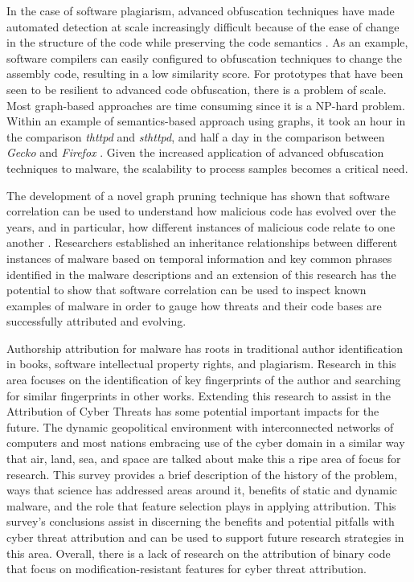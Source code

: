\documentclass[12pt]{report}
\begin{document}
In the case of software plagiarism, advanced obfuscation techniques have made automated detection at scale increasingly difficult because of the ease of change in the structure of the code while preserving the code semantics \cite{xu2020revisiting}.  As an example, software compilers can easily configured to obfuscation techniques to change the assembly code, resulting in a low similarity score.  For prototypes that have been seen to be resilient to advanced code obfuscation, there is a problem of scale.  Most graph-based approaches are time consuming since it is a NP-hard problem.  Within an example of semantics-based approach using graphs, it took an hour in  the  comparison \emph{thttpd} and \emph{sthttpd}, and half a day in the comparison between \emph{Gecko} and \emph{Firefox} \cite{luo2014semantics}.  Given the increased application of advanced obfuscation techniques to malware, the scalability to process samples becomes a critical need.

The development of a novel graph pruning technique has shown that software correlation can be used to understand how malicious code has evolved over the years, and in particular, how different instances of malicious code relate to one another \cite{gupta2009empirical}.  Researchers established an inheritance relationships between different instances of malware based on temporal information and key common phrases identified in the malware descriptions and an extension of this research has the potential to show that software correlation can be used to inspect known examples of malware in order to gauge how threats and their code bases are successfully attributed and evolving.

Authorship attribution for malware has roots in traditional author identification in books, software intellectual property rights, and plagiarism.  Research in this area focuses on the identification of key fingerprints of the author and searching for similar fingerprints in other works.  Extending this research to assist in the Attribution of Cyber Threats has some potential important impacts for the future.  The dynamic geopolitical environment with interconnected networks of computers and most nations embracing use of the cyber domain in a similar way that air, land, sea, and space are talked about make this a ripe area of focus for research.  This survey provides a brief description of the history of the problem, ways that science has addressed areas around it, benefits of static and dynamic malware, and the role that feature selection plays in applying attribution.  This survey’s conclusions assist in discerning the benefits and potential pitfalls with cyber threat attribution and can be used to support future research strategies in this area.  Overall, there is a lack of research on the attribution of binary code that focus on modification-resistant features for cyber threat attribution.
\end{document}
